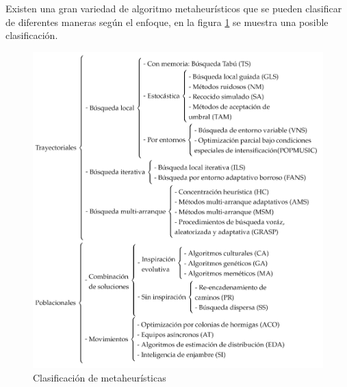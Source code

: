 Existen una gran variedad de algoritmo metaheurísticos que se pueden clasificar de diferentes maneras según el enfoque, en la figura \ref{fig:clasif-metahs} se muestra una posible clasificación.

\begin{figure}[H]
	\centering
	\includegraphics[scale=0.84]{Figures/diagrama-meta.pdf}
	\caption{Clasificación de metaheurísticas}
	\label{fig:clasif-metahs}
\end{figure}
